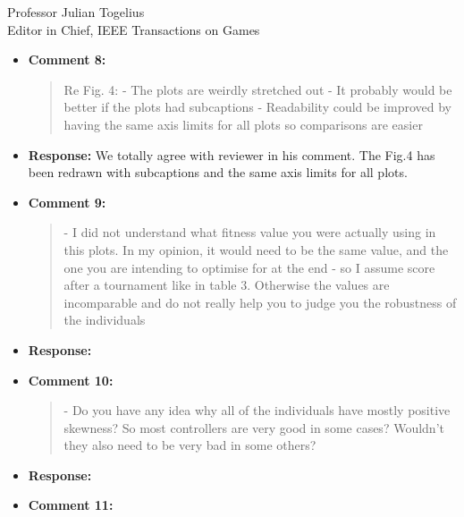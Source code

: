 \documentclass[10pt]{letter} %
\begin{document}
\begin{letter}{Professor Julian Togelius \\ Editor in Chief, IEEE Transactions on Games}
\begin{enumerate}
\begin{itemize}
{				In every process, three controllers are obtained depending on the application of the GPS: in every generation (E), every 5 generations (5) and in the last generation(L). The acronym VA  stands for "varying $\alpha$" in the names of  controllers with BLX and decreasing $\alpha$.
				Hence, we experimented six controllers in all: the new
				proposed controllers {\sf GFC-GPSVAE} and {\sf GFC-GPSE}, our previous four GPS based controllers  [43]: {}, {},{} and {}..
				Also and for comparison purpose, two reference controllers have been considered: {}[43] and {}[40], they both use the fitness function $f_{AVS}$ (Equation 1) value for selection.
				All these controllers are summarized in Table.2. 
			}
			\item {\bf Comment 8:}
				\begin{quote}	
					Re Fig. 4:
					- The plots are weirdly stretched out
					- It probably would be better if the plots had subcaptions
					- Readability could be improved by having the same axis limits for all plots so comparisons are easier
				\end{quote}	
			\item {\bf Response:} 
				We totally agree with reviewer in his comment. The Fig.4 has been redrawn with subcaptions and the same axis limits for all plots.
			\item {\bf Comment 9:}
				\begin{quote}	
					- I did not understand what fitness value you were actually using in this plots. In my opinion, it would need to be the same value, and the one you are intending to optimise for at the end - so I assume score after a tournament like in table 3. Otherwise the values are incomparable and do not really help you to judge you the robustness of the individuals
				\end{quote}	
			\item {\bf Response:} 
			\item {\bf Comment 10:}
				\begin{quote}	
					- Do you have any idea why all of the individuals have mostly positive skewness? So most controllers are very good in some cases? Wouldn't they also need to be very bad in some others?
				\end{quote}	
			\item {\bf Response:} 
			\item {\bf Comment 11:}

\end{itemize}
\end{enumerate}
\end{letter}
\end{document}
